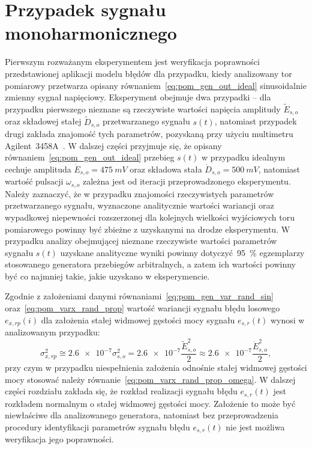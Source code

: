 \section{Przypadek sygnału monoharmonicznego}

Pierwszym rozważanym eksperymentem jest weryfikacja poprawności przedstawionej aplikacji modelu błędów dla przypadku, kiedy analizowany tor pomiarowy przetwarza opisany równaniem~\eqref{eq:pom_gen_out_ideal} sinusoidalnie zmienny sygnał napięciowy. Eksperyment obejmuje dwa przypadki -- dla przypadku pierwszego nieznane są rzeczywiste wartości napięcia amplitudy $\tilde{E}_{s,o}$ oraz składowej stałej $\tilde{D}_{s,o}$ przetwarzanego sygnału $s(t)$, natomiast przypadek drugi zakłada znajomość tych parametrów, pozyskaną przy użyciu multimetru Agilent~3458A~\cite{agilent_manual}. W dalszej części przyjmuje się, że opisany równaniem~\eqref{eq:pom_gen_out_ideal} przebieg $s(t)$ w przypadku idealnym cechuje amplituda $\dot{E}_{s,o} = \qty{475}{mV}$ oraz składowa stała $\dot{D}_{s,o} = \qty{500}{mV}$, natomiast wartość pulsacji $\omega_{s,o}$ zależna jest od iteracji przeprowadzonego eksperymentu.
Należy zaznaczyć, że w przypadku znajomości rzeczywistych parametrów przetwarzanego sygnału, wyznaczone analitycznie wartości wariancji oraz wypadkowej niepewności rozszerzonej dla kolejnych wielkości wyjściowych toru pomiarowego powinny być zbieżne z uzyskanymi na drodze eksperymentu. W przypadku analizy obejmującej nieznane rzeczywiste wartości parametrów sygnału $s(t)$ uzyskane analityczne wyniki powinny dotyczyć~\qty{95}{\percent} egzemplarzy stosowanego generatora przebiegów arbitralnych, a zatem ich wartości powinny być co najmniej takie, jakie uzyskano w eksperymencie.

Zgodnie z założeniami danymi równaniami~\eqref{eq:pom_gen_var_rand_sin} oraz~\eqref{eq:pom_varx_rand_prop} wartość wariancji sygnału błędu losowego $e_{x,rp}(i)$ dla założenia stałej widmowej gęstości mocy sygnału $e_{s,r}(t)$ wynosi w analizowanym przypadku:
\begin{equation}
\sigma_{x,rp}^{2} \cong \num{2.6e-7} \sigma_{s,o}^{2} = \num{2.6e-7} \frac{\tilde{E}_{s,o}^{2}}{2} \approx \num{2.6e-7} \frac{\dot{E}_{s,o}^{2}}{2} \label{eq:pom_mono_rand_var_in},
\end{equation}
przy czym w przypadku niespełnienia założenia odnośnie stałej widmowej gęstości mocy stosować należy równanie~\eqref{eq:pom_varx_rand_prop_omega}. W dalszej części rozdziału zakłada się, że rozkład realizacji sygnału błędu $e_{s,r}(t)$ jest rozkładem normalnym o stałej widmowej gęstości mocy. Założenie to może być niewłaściwe dla analizowanego generatora, natomiast bez przeprowadzenia procedury identyfikacji parametrów sygnału błędu $e_{s,r}(t)$ nie jest możliwa weryfikacja jego poprawności.

